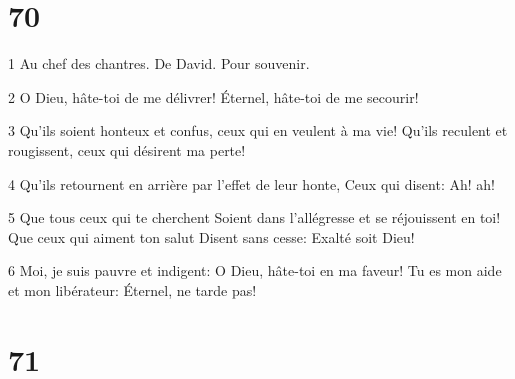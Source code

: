 \chapter{70}

\par 1 Au chef des chantres. De David. Pour souvenir.
\par 2 O Dieu, hâte-toi de me délivrer! Éternel, hâte-toi de me secourir!
\par 3 Qu'ils soient honteux et confus, ceux qui en veulent à ma vie! Qu'ils reculent et rougissent, ceux qui désirent ma perte!
\par 4 Qu'ils retournent en arrière par l'effet de leur honte, Ceux qui disent: Ah! ah!
\par 5 Que tous ceux qui te cherchent Soient dans l'allégresse et se réjouissent en toi! Que ceux qui aiment ton salut Disent sans cesse: Exalté soit Dieu!
\par 6 Moi, je suis pauvre et indigent: O Dieu, hâte-toi en ma faveur! Tu es mon aide et mon libérateur: Éternel, ne tarde pas!

\chapter{71}

